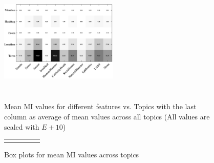 \begin{figure}[t!]
\centering
\includegraphics[width=0.5\textwidth, height=60mm]{images/avgMI_gray.pdf}
\caption{Mean MI values for different features vs. Topics with the last column as average of mean values across all topics (All values are scaled with $E+10$)}
\label{fig:avgMI}
\end{figure}

\begin{figure}[t!]
\centering
\begin{tabular}{ccccc}
\fbox{\rule{10cm}{3.85cm}}
\end{tabular}
\caption {Box plots for mean MI values across topics}
\label{fig:avgMIBP}
\vspace{2mm}
\end{figure}

